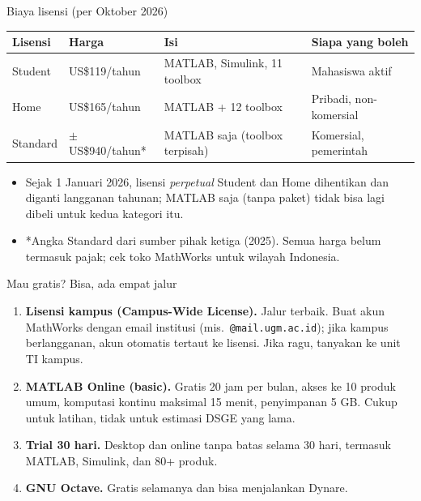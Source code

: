 \documentclass[aspectratio=169,11pt]{beamer}
\begin{document}
\begin{frame}{Biaya lisensi (per Oktober 2026)}
\centering\small
\renewcommand{\arraystretch}{1.2}
\begin{tabular}{l l l l}
\toprule
Lisensi & Harga & Isi & Siapa yang boleh \\
\midrule
Student  & US\$119/tahun & MATLAB, Simulink, 11 toolbox & Mahasiswa aktif \\
Home     & US\$165/tahun & MATLAB + 12 toolbox & Pribadi, non-komersial \\
Standard & $\pm$US\$940/tahun* & MATLAB saja (toolbox terpisah) & Komersial, pemerintah \\
\bottomrule
\end{tabular}

\vspace{0.7em}
\raggedright\footnotesize
\begin{itemize}
  \item Sejak 1 Januari 2026, lisensi \emph{perpetual} Student dan Home
        dihentikan dan diganti langganan tahunan; MATLAB saja (tanpa paket)
        tidak bisa lagi dibeli untuk kedua kategori itu.
  \item *Angka Standard dari sumber pihak ketiga (2025). Semua harga belum
        termasuk pajak; cek toko MathWorks untuk wilayah Indonesia.
\end{itemize}
\end{frame}

\begin{frame}{Mau gratis? Bisa, ada empat jalur}
\begin{enumerate}
  \item \textbf{Lisensi kampus (Campus-Wide License).} Jalur terbaik.
        Buat akun MathWorks dengan email institusi (mis.\
        \texttt{@mail.ugm.ac.id}); jika kampus berlangganan, akun otomatis
        tertaut ke lisensi. Jika ragu, tanyakan ke unit TI kampus.
  \item \textbf{MATLAB Online (basic).} Gratis 20 jam per bulan, akses ke
        10 produk umum, komputasi kontinu maksimal 15 menit, penyimpanan
        5 GB. Cukup untuk latihan, \alert{tidak} untuk estimasi DSGE yang lama.
  \item \textbf{Trial 30 hari.} Desktop dan online tanpa batas selama
        30 hari, termasuk MATLAB, Simulink, dan 80+ produk.
  \item \textbf{GNU Octave.} Gratis selamanya dan bisa menjalankan Dynare.
\end{enumerate}
\end{frame}
\end{document}
